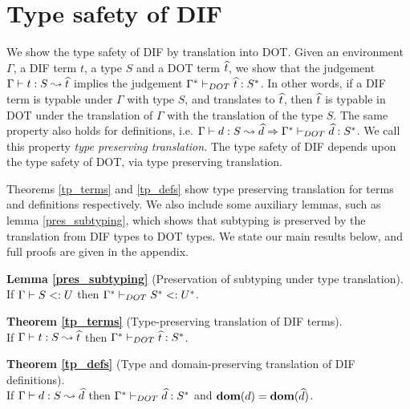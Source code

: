 \section{Type safety of DIF}

We show the type safety of DIF by translation into DOT. Given an environment
$\Gamma$, a DIF term $t$, a type $S$ and a DOT term $\widehat{t}$, we show that the
judgement $\Gamma \vdash t: S \leadsto \widehat{t}$ implies the judgement
$\Gamma^{*} \vdash_{DOT} \widehat{t}: S^{*}$. In other words, if a DIF term is
typable under $\Gamma$ with type $S$, and translates to $\widehat{t}$, then
$\widehat{t}$ is typable in DOT under the translation of $\Gamma$ with the
translation of the type $S$. The same property also holds for definitions, i.e.
$\Gamma \vdash d: S \leadsto \widehat{d} \Rightarrow
\Gamma^{*} \vdash_{DOT} \widehat{d}: S^{*}$. We call this property \emph{type
preserving translation}. The type safety of DIF depends upon the type safety of
DOT, via type preserving translation.

Theorems \ref{tp_terms} and \ref{tp_defs} show type preserving translation for
terms and definitions respectively. We also include some auxiliary lemmas, such
as lemma \ref{pres_subtyping}, which shows that subtyping is preserved by the
translation from DIF types to DOT types. We state our main results below, and
full proofs are given in the appendix.

\vspace{3mm}

\noindent \textbf{Lemma \ref{pres_subtyping}} (Preservation of subtyping under
type translation). \\
If $\Gamma \vdash S <: U$ then $\Gamma^{*} \vdash_{DOT} S^{*} <: U^{*}$.

\vspace{3mm}

\noindent \textbf{Theorem \ref{tp_terms}} (Type-preserving translation of DIF
terms). \\
If $\Gamma \vdash t: S \leadsto \widehat{t}$ then
$\Gamma^{*} \vdash_{DOT} \widehat{t}: S^{*}$.

\vspace{3mm}

\noindent \textbf{Theorem \ref{tp_defs}} (Type and domain-preserving
translation of DIF definitions). \\
If $\Gamma \vdash d: S \leadsto \widehat{d}$ then $\Gamma^{*} \vdash_{DOT} \widehat{d}: S^{*}$
and $\textbf{dom}(d) = \textbf{dom}(\widehat{d})$.

\vspace{3mm}
